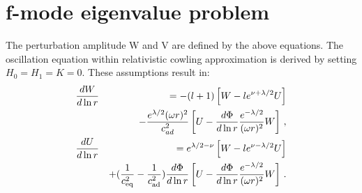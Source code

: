 \section{f-mode eigenvalue problem}
The perturbation amplitude W and V are defined by the above equations. The  oscillation equation within relativistic cowling approximation is derived by setting $H_0 = H_1 = K = 0$. These assumptions result in:
\begin{eqnarray}
	\label{eq:ODE_DL3_cowling_UW}
	\frac{dW}{d\ln r} && = -(l+1)\left[W-l e^{\nu +\lambda/2} U\right] \nonumber \\
	&& -\frac{e^{\lambda/2}(\omega r)^2}{c_{ad}^2}\left[U-\frac{d\Phi}{d \ln r} \frac{e^{-\lambda/2}}{(\omega r)^2} W\right ]\,,\\
	\frac{dU}{d\ln r} && = e^{\lambda/2-\nu}\left[W -le^{\nu-\lambda/2}U\right] \nonumber \\
	&& + (\frac{1}{c_{\rm eq}^2}-\frac{1}{c_{\rm ad}^2} )\frac{d\Phi}{d \ln r} \left [ U -\frac{d\Phi}{d \ln r} \frac{e^{-\lambda/2}}{(\omega r)^2} W\right ]\,.\label{eq:ODE_DL4_cowling_UW}
\end{eqnarray}
